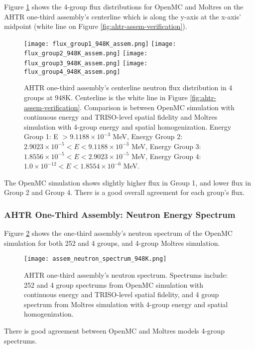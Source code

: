 Figure \ref{fig:flux_948K_assem} shows the 4-group flux distributions for OpenMC and 
Moltres on the \gls{AHTR} one-third assembly's centerline which is along the y-axis at 
the x-axis' midpoint (white line on Figure \ref{fig:ahtr-assem-verification}). 
\begin{figure}[htbp]
    \centering
    \texttt{[image: flux\_group1\_948K\_assem.png]} 
    \texttt{[image: flux\_group2\_948K\_assem.png]} 
    \texttt{[image: flux\_group3\_948K\_assem.png]} 
    \texttt{[image: flux\_group4\_948K\_assem.png]} 
    \caption{\acrfull{AHTR} one-third assembly's centerline neutron flux distribution 
    in 4 groups at 948K. 
    Centerline is the white line in Figure \ref{fig:ahtr-assem-verification}.
    Comparison is between OpenMC simulation with continuous energy 
    and TRISO-level spatial fidelity and Moltres simulation with 4-group energy and 
    spatial homogenization.
    Energy Group 1: E $> 9.1188 \times 10^{-3}$ MeV, 
    Energy Group 2: $2.9023 \times 10^{-5} < E < 9.1188 \times 10^{-3}$ MeV,
    Energy Group 3:  $1.8556 \times 10^{-5} < E < 2.9023 \times 10^{-5}$ MeV,
    Energy Group 4:  $1.0 \times 10^{-12} < E < 1.8554 \times 10^{-6}$ MeV.}
    \label{fig:flux_948K_assem}
\end{figure}

The OpenMC simulation shows slightly higher flux in Group 1, and lower flux in 
Group 2 and Group 4. 
There is a good overall agreement for each group's flux.

\subsubsection{AHTR One-Third Assembly: Neutron Energy Spectrum}
Figure \ref{fig:assem_neutron_spectrum_948K} shows the one-third assembly's neutron 
spectrum of the OpenMC simulation for both 252 and 4 groups, and 4-group Moltres 
simulation. 
 \begin{figure}[htbp]
    \centering
    \texttt{[image: assem\_neutron\_spectrum\_948K.png]}
    \caption{\acrfull{AHTR} one-third assembly's neutron spectrum.
    Spectrums include: 252 and 4 group spectrums from OpenMC simulation with continuous 
    energy and TRISO-level spatial fidelity, and 4 group spectrum from Moltres 
    simulation with 4-group energy and spatial homogenization.}  
    \label{fig:assem_neutron_spectrum_948K}
\end{figure}
There is good agreement between OpenMC and Moltres models 4-group spectrums. 

